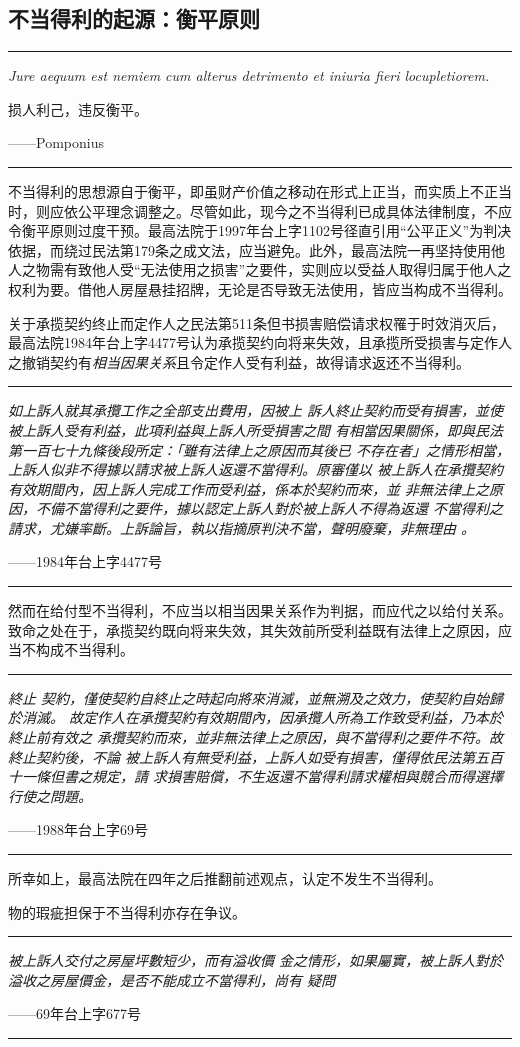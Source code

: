 \documentclass[UTF-8]{ctexrep}
\newcommand{\article}[1]{民法第#1条}
\newcommand{\cas}[2]{#1年台上字#2号}
\newcommand{\prov}[2]{\par\noindent\rule{\textwidth}{1pt}\par {\itshape #1}\par\mbox{}\hfill——#2\par\noindent\rule{\textwidth}{1pt}}
\begin{document}
  \subsection{不当得利的起源：衡平原则}
  \prov{Jure aequum est nemiem cum alterus detrimento et iniuria fieri locupletiorem.\par 损人利己，违反衡平。}{Pomponius}
  \par
  不当得利的思想源自于衡平，即虽财产价值之移动在形式上正当，而实质上不正当时，则应依公平理念调整之。尽管如此，现今之不当得利已成具体法律制度，不应令衡平原则过度干预。最高法院于\cas{1997}{1102}径直引用“公平正义”为判决依据，而绕过\article{179}之成文法，应当避免。此外，最高法院一再坚持使用他人之物需有致他人受“无法使用之损害”之要件，实则应以受益人取得归属于他人之权利为要。借他人房屋悬挂招牌，无论是否导致无法使用，皆应当构成不当得利。
  \par
  关于承揽契约终止而定作人之\article{511}但书损害赔偿请求权罹于时效消灭后，最高法院\cas{1984}{4477}认为承揽契约向将来失效，且承揽所受损害与定作人之撤销契约有\emph{相当因果关系}且令定作人受有利益，故得请求返还不当得利。
  \prov{如上訴人就其承攬工作之全部支出費用，因被上
訴人終止契約而受有損害，並使被上訴人受有利益，此項利益與上訴人所受損害之間
有相當因果關係，即與民法第一百七十九條後段所定：「雖有法律上之原因而其後已
不存在者」之情形相當，上訴人似非不得據以請求被上訴人返還不當得利。原審僅以
被上訴人在承攬契約有效期間內，因上訴人完成工作而受利益，係本於契約而來，並
非無法律上之原因，不備不當得利之要件，據以認定上訴人對於被上訴人不得為返還
不當得利之請求，尤嫌率斷。上訴論旨，執以指摘原判決不當，聲明廢棄，非無理由
。}{\cas{1984}{4477}}
  \par
  然而在给付型不当得利，不应当以相当因果关系作为判据，而应代之以给付关系。致命之处在于，承揽契约既向将来失效，其失效前所受利益既有法律上之原因，应当不构成不当得利。
  \par
  \prov{終止
契約，僅使契約自終止之時起向將來消滅，並無溯及之效力，使契約自始歸於消滅。
故定作人在承攬契約有效期間內，因承攬人所為工作致受利益，乃本於終止前有效之
承攬契約而來，並非無法律上之原因，與不當得利之要件不符。故終止契約後，不論
被上訴人有無受利益，上訴人如受有損害，僅得依民法第五百十一條但書之規定，請
求損害賠償，不生返還不當得利請求權相與競合而得選擇行使之問題。}{\cas{1988}{69}}
  \par
  所幸如上，最高法院在四年之后推翻前述观点，认定不发生不当得利。
  \par
  物的瑕疵担保于不当得利亦存在争议。
  \prov{被上訴人交付之房屋坪數短少，而有溢收價
金之情形，如果屬實，被上訴人對於溢收之房屋價金，是否不能成立不當得利，尚有
疑問}{\cas{69}{677}}
\end{document}
